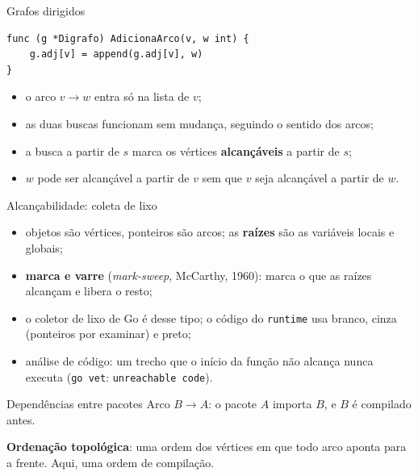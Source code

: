 \documentclass{beamer}
\begin{document}
\begin{frame}[fragile]{Grafos dirigidos}
	\begin{verbatim}
func (g *Digrafo) AdicionaArco(v, w int) {
	g.adj[v] = append(g.adj[v], w)
}
\end{verbatim}

	\begin{itemize}
		\item o arco $v \to w$ entra só na lista de $v$;
		\item as duas buscas funcionam sem mudança, seguindo o sentido dos arcos;
		\item a busca a partir de $s$ marca os vértices \textbf{alcançáveis} a
		      partir de $s$;
		\item $w$ pode ser alcançável a partir de $v$ sem que $v$ seja alcançável
		      a partir de $w$.
	\end{itemize}
\end{frame}

\begin{frame}{Alcançabilidade: coleta de lixo}
	\begin{center}
		\scalebox{0.9}{\grafoMemoria}
	\end{center}

	\begin{itemize}
		\small
		\item objetos são vértices, ponteiros são arcos; as \textbf{raízes} são
		      as variáveis locais e globais;
		\item \textbf{marca e varre} (\textit{mark-sweep}, McCarthy, 1960): marca
		      o que as raízes alcançam e libera o resto;
		\item o coletor de lixo de Go é desse tipo; o código do \texttt{runtime}
		      usa branco, cinza (ponteiros por examinar) e preto;
		\item análise de código: um trecho que o início da função não alcança
		      nunca executa (\texttt{go vet}: \texttt{unreachable code}).
	\end{itemize}
\end{frame}

\begin{frame}{Dependências entre pacotes}
	Arco $B \to A$: o pacote $A$ importa $B$, e $B$ é compilado antes.

	\begin{center}
		\scalebox{0.85}{\grafoPacotes}
	\end{center}

	\textbf{Ordenação topológica}: uma ordem dos vértices em que todo arco
	aponta para a frente. Aqui, uma ordem de compilação.
\end{frame}
\end{document}
